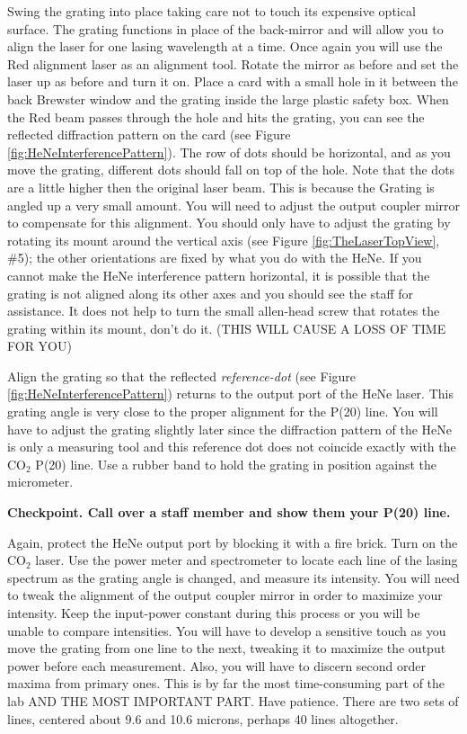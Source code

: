 \documentclass{../lab}
\begin{document}
\begin{enumerate}
    Swing the grating into place taking care not to touch its expensive optical surface. The grating functions in place of the back-mirror and will allow you to align the laser for one lasing wavelength at a time. Once again you will use the Red alignment laser as an alignment tool. Rotate the mirror as before and set the laser up as before and turn it on. Place a card with a small hole in it between the back Brewster window and the grating inside the large plastic safety box. When the Red beam passes through the hole and hits the grating, you can see the reflected diffraction pattern on the card (see Figure \ref{fig:HeNeInterferencePattern}). The row of dots should be horizontal, and as you move the grating, different dots should fall on top of the hole. Note that the dots are a little higher then the original laser beam. This is because the Grating is angled up a very small amount. You will need to adjust the output coupler mirror to compensate for this alignment. You should only have to adjust the grating by rotating its mount around the vertical axis (see Figure \ref{fig:TheLaserTopView}, \#5); the other orientations are fixed by what you do with the HeNe. If you cannot make the HeNe interference pattern horizontal, it is possible that the grating is not aligned along its other axes and you should see the staff for assistance. It does not help to turn the small allen-head screw that rotates the grating within its mount, don't do it. (THIS WILL CAUSE A LOSS OF TIME FOR YOU)
    
    Align the grating so that the reflected \emph{reference-dot} (see Figure \ref{fig:HeNeInterferencePattern}) returns to the output port of the HeNe laser. This grating angle is very close to the proper alignment for the P(20) line. You will have to adjust the grating slightly later since the diffraction pattern of the HeNe is only a measuring tool and this reference dot does not coincide exactly with the CO$_2$ P(20) line. Use a rubber band to hold the grating in position against the micrometer.
    
      \textbf{ Checkpoint. Call over a staff member and show them your P(20) line.}
    
    Again, protect the HeNe output port by blocking it with a fire brick. Turn on the CO$_2$ laser. Use the power meter and spectrometer to locate each line of the lasing spectrum as the grating angle is changed, and measure its intensity. You will need to tweak the alignment of the output coupler mirror in order to maximize your intensity. Keep the input-power constant during this process or you will be unable to compare intensities. You will have to develop a sensitive touch as you move the grating from one line to the next, tweaking it to maximize the output power before each measurement. Also, you will have to discern second order maxima from primary ones. This is by far the most time-consuming part of the lab AND THE MOST IMPORTANT PART. Have patience. There are two sets of lines, centered about 9.6 and 10.6 microns, perhaps 40 lines altogether.
   

\end{enumerate}
\end{document}

